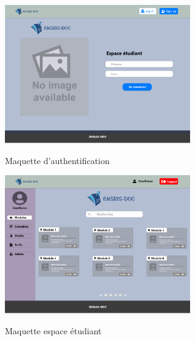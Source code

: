 \documentclass{article}
\begin{document}
{ \begin{minipage}[c]{.46\linewidth}
     \begin{center}
      \vspace{1cm}
             \includegraphics[width=8cm]{Log In (1).png}
             \caption{Maquette d'authentification}
             \label{fig:Maquette d'authentification}
         \end{center}
   \end{minipage} \hfill
   \begin{minipage}[c]{.46\linewidth}
    \begin{center}
    \vspace{1cm}
            \includegraphics[width=8cm]{Page d'accueil (1).png}
            \caption{Maquette espace étudiant}
            \label{Maquette espace étudiant}
        \end{center}
 \end{minipage}
 
}
\end{document}
